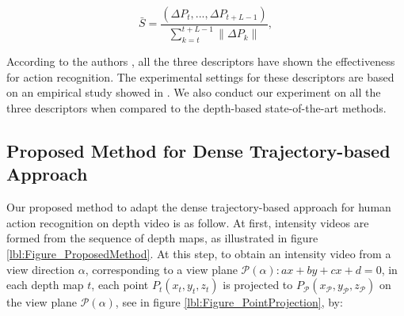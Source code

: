 \documentclass[final,3p,times,twocolumn]{elsarticle}
\begin{document}
\begin{equation}
	\textit{$\bar{S} = \frac{(\Delta P_t, ..., \Delta P_{t+L-1})}{\sum_{k=t}^{t+L-1}\|\Delta P_k\|}$},
\end{equation}
\fi

According to the authors \cite{laptev2008learning, wang2011densetraj, wang2009evaluation, liu2009recognizing}, all the three descriptors have shown the effectiveness for action recognition. The experimental settings for these descriptors are based on an empirical study showed in \cite{wang2011densetraj}. We also conduct our experiment on all the three descriptors when compared to the depth-based state-of-the-art methods.

\subsection{Proposed Method for Dense Trajectory-based Approach}


Our proposed method to adapt the dense trajectory-based approach for human action recognition on depth video is as follow. At first, intensity videos are formed from the sequence of depth maps, as illustrated in figure \ref{lbl:Figure_ProposedMethod}. At this step, to obtain an intensity video from a view direction $\alpha$, corresponding to a view plane $\mathcal{P}(\alpha): ax + by + cx + d = 0$, in each depth map $t$, each point $P_t(x_t,y_t,z_t)$ is projected to $P_\mathcal{P}(x_\mathcal{P},y_\mathcal{P},z_\mathcal{P})$ on the view plane $\mathcal{P}(\alpha)$, see in figure \ref{lbl:Figure_PointProjection}, by:
\end{document}
